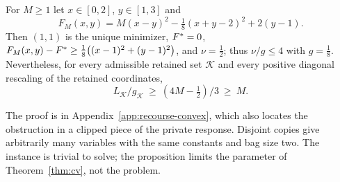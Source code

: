 \begin{proposition}\label{prop:cv-limit}
For $M\ge1$ let $x\in[0,2]$, $y\in[1,3]$ and
\[
F_M(x,y)=M(x-y)^2-\tfrac18(x+y-2)^2+2(y-1).
\]
Then $(1,1)$ is the unique minimizer, $F^{*}=0$,
$F_M(x,y)-F^{*}\ge\frac18\bigl((x-1)^2+(y-1)^2\bigr)$, and $\nu=\frac12$; thus
$\nu/g\le4$ with $g=\frac18$. Nevertheless, for every admissible retained
set $\mathcal K$ and every positive diagonal rescaling of the retained
coordinates,
\[
L_{\mathcal K}/g_{\mathcal K}\ \ge\ (4M-\tfrac12)/3\ \ge\ M.
\]
\end{proposition}

The proof is in Appendix~\ref{app:recourse-convex}, which also locates the
obstruction in a clipped piece of the private response. Disjoint copies give
arbitrarily many variables with the same constants and bag size two. The
instance is trivial to solve; the proposition limits the parameter of
Theorem~\ref{thm:cv}, not the problem.
